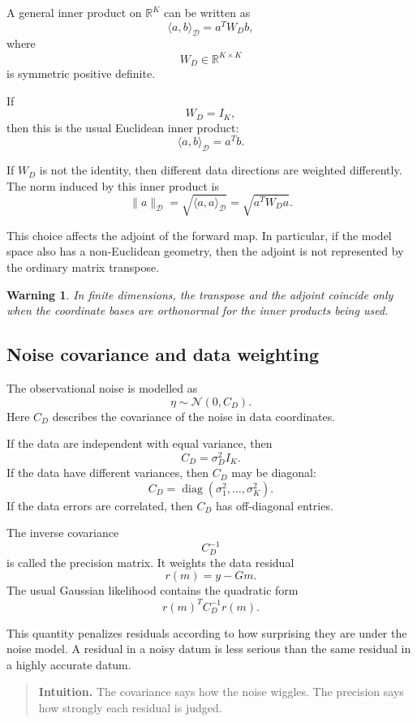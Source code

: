 \documentclass[11pt,a4paper]{book}
\newtheorem{warning}[definition]{Warning}
\newenvironment{intuition}
  {\begin{quote}\textbf{Intuition.}}
  {\end{quote}}
\newcommand{\D}{\mathcal{D}}      %
\newcommand{\R}{\mathbb{R}}
\newcommand{\noise}{\eta}
\newcommand{\obs}{y}
\newcommand{\G}{G}
\begin{document}
A general inner product on $\R^K$ can be written as
\[
    \langle a,b\rangle_{\D}
    =
    a^T W_D b,
\]
where
\[
    W_D\in\R^{K\times K}
\]
is symmetric positive definite.

If
\[
    W_D=I_K,
\]
then this is the usual Euclidean inner product:
\[
    \langle a,b\rangle_{\D}
    =
    a^T b.
\]

If $W_D$ is not the identity, then different data directions are weighted
differently. The norm induced by this inner product is
\[
    \|a\|_{\D}
    =
    \sqrt{\langle a,a\rangle_{\D}}
    =
    \sqrt{a^T W_D a}.
\]

This choice affects the adjoint of the forward map. In particular, if the model
space also has a non-Euclidean geometry, then the adjoint is not represented by
the ordinary matrix transpose.

\begin{warning}
In finite dimensions, the transpose and the adjoint coincide only when the
coordinate bases are orthonormal for the inner products being used.
\end{warning}

\subsection{Noise covariance and data weighting}

The observational noise is modelled as
\[
    \noise \sim \mathcal{N}(0,C_D).
\]
Here $C_D$ describes the covariance of the noise in data coordinates.

If the data are independent with equal variance, then
\[
    C_D = \sigma_D^2 I_K.
\]
If the data have different variances, then $C_D$ may be diagonal:
\[
    C_D =
    \operatorname{diag}(\sigma_1^2,\ldots,\sigma_K^2).
\]
If the data errors are correlated, then $C_D$ has off-diagonal entries.

The inverse covariance
\[
    C_D^{-1}
\]
is called the precision matrix. It weights the data residual
\[
    r(m)=\obs-\G m.
\]
The usual Gaussian likelihood contains the quadratic form
\[
    r(m)^T C_D^{-1} r(m).
\]

This quantity penalizes residuals according to how surprising they are under the
noise model. A residual in a noisy datum is less serious than the same residual
in a highly accurate datum.

\begin{intuition}
The covariance says how the noise wiggles.
The precision says how strongly each residual is judged.
\end{intuition}
\end{document}
